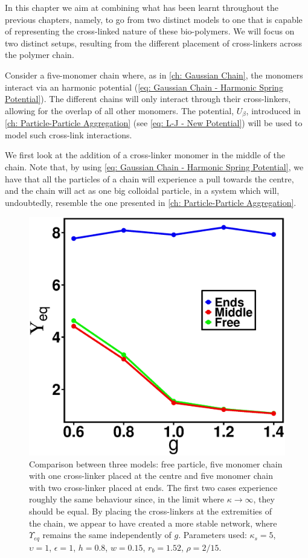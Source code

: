 \documentclass[../../main.tex]{subfiles}
\begin{document}
%
    In this chapter we aim at combining what has been learnt throughout the previous chapters, namely, to go from two distinct models to one that is capable of representing the cross-linked nature of these bio-polymers. We will focus on two distinct setups, resulting from the different placement of cross-linkers across the polymer chain.
    
    Consider a five-monomer chain where, as in \cref{ch: Gaussian Chain}, the monomers interact via an harmonic potential (\cref{eq: Gaussian Chain - Harmonic Spring Potential}). The different chains will only interact through their cross-linkers, allowing for the overlap of all other monomers. The potential, $U_{\beta}$, introduced in \cref{ch: Particle-Particle Aggregation} (see \cref{eq: L-J - New Potential}) will be used to model such cross-link interactions.
    
    We first look at the addition of a cross-linker monomer in the middle of the chain. Note that, by using \cref{eq: Gaussian Chain - Harmonic Spring Potential}, we have that all the particles of a chain will experience a pull towards the centre, and the chain will act as one big colloidal particle, in a system which will, undoubtedly, resemble the one presented in \cref{ch: Particle-Particle Aggregation}.
        \begin{figure}[h]
            \centering
            \includegraphics[scale=0.4]{Figures/no_repel.eps}
            \caption{Comparison between three models: free particle, five monomer chain with one cross-linker placed at the centre and five monomer chain with two cross-linker placed at ends. The first two cases experience roughly the same behaviour since, in the limit where $\kappa \rightarrow \infty$, they should be equal. By placing the cross-linkers at the extremities of the chain, we appear to have created a more stable network, where $\Upsilon_{eq}$ remains the same independently of $g$. Parameters used: $\kappa_s = 5$, $\upsilon = 1$, $\epsilon = 1$, $h = 0.8$, $w = 0.15$, $r_b = 1.52$, $\rho = 2/15$.}
            \label{fig: no repel - comparison}
        \end{figure}
        
\end{document}
